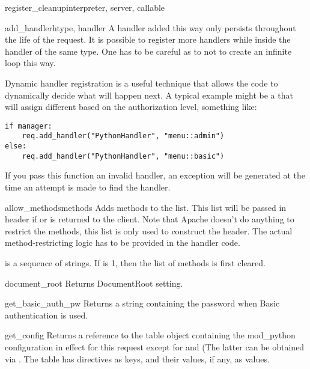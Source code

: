 \begin{funcdesc}{register_cleanup}{interpreter, server, callable}
\begin{methoddesc}[request]{add_handler}{htype, handler}
  A handler added this way only persists throughout the life of the
  request. It is possible to register more handlers while inside the
  handler of the same type. One has to be careful as to not to create
  an infinite loop this way.

  Dynamic handler registration is a useful technique that allows the
  code to dynamically decide what will happen next. A typical example
  might be a  that will assign different
   based on the authorization level, something
  like:

  \begin{verbatim}
if manager:
    req.add_handler("PythonHandler", "menu::admin")
else:
    req.add_handler("PythonHandler", "menu::basic")
  \end{verbatim}                              

  \begin{notice}
    If you pass this function an invalid handler, an exception will be
    generated at the time an attempt is made to find the handler. 
  \end{notice}
\end{methoddesc}

\begin{methoddesc}[request]{allow_methods}{methods}
  Adds methods to the  list. This list
  will be passed in  header if
   or 
  is returned to the client. Note that Apache doesn't do anything to
  restrict the methods, this list is only used to construct the
  header. The actual method-restricting logic has to be provided in the
  handler code.

   is a sequence of strings. If  is 1, then
  the list of methods is first cleared.
\end{methoddesc}

\begin{methoddesc}[request]{document_root}{}
  Returns DocumentRoot setting.
\end{methoddesc}

\begin{methoddesc}[request]{get_basic_auth_pw}{}
  Returns a string containing the password when Basic authentication is
  used.
\end{methoddesc}

\begin{methoddesc}[request]{get_config}{}
  Returns a reference to the table object containing the mod_python
  configuration in effect for this request except for
   and  (The latter can be
  obtained via . The table has directives as
  keys, and their values, if any, as values.
\end{methoddesc}


\end{funcdesc}
